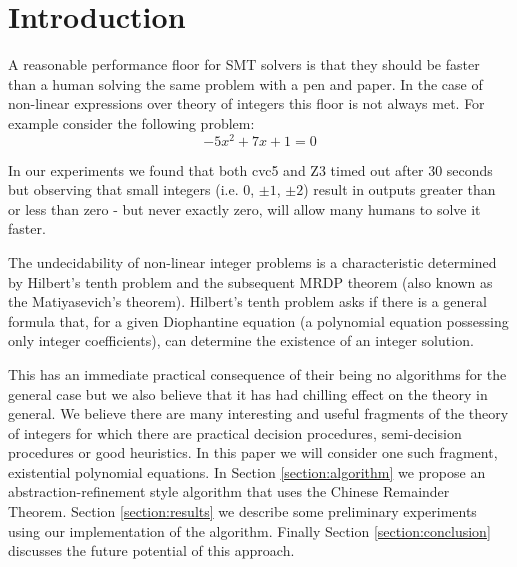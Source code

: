 \section{Introduction}


A reasonable performance floor for SMT solvers is that they should be
faster than a human solving the same problem with a pen and paper.
%
In the case of non-linear expressions over theory of integers this
floor is not always met.
%
For example consider the following problem: 
\[-5x^2 + 7x + 1 = 0\]

In our experiments we found that both cvc5 and Z3 timed out after 30 
seconds but observing that small integers (i.e. $0$, $\pm 1$, $\pm 2$)
result in outputs greater than or less than zero - but never exactly
zero, will allow many humans to solve it faster.

The undecidability of non-linear integer problems is a characteristic
determined by Hilbert's tenth problem and the subsequent MRDP theorem 
(also known as the Matiyasevich's theorem). Hilbert's tenth problem
asks if there is a general formula that, for a given Diophantine 
equation (a polynomial equation possessing only integer 
coefficients), can determine the existence of an integer solution.

This has an immediate practical consequence of their being no
algorithms for the general case but we also believe that it has had
chilling effect on the theory in general.
%
We believe there are many interesting and useful fragments of the
theory of integers for which there are practical decision procedures,
semi-decision procedures or good heuristics.
In this paper we will consider one such fragment, existential
polynomial equations.
%
In Section \ref{section:algorithm} we propose an
abstraction-refinement style algorithm that uses the Chinese Remainder
Theorem.
Section \ref{section:results} we describe some preliminary experiments
using our implementation of the algorithm.
Finally Section \ref{section:conclusion} discusses the future
potential of this approach.

